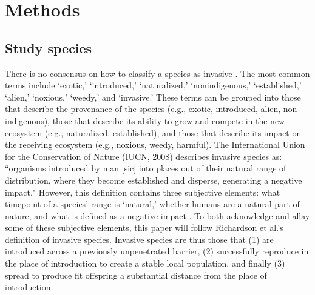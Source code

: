 \documentclass[12pt]{article}\usepackage[]{graphicx}\usepackage[]{color}
\begin{document}
	 
	\section{Methods}
	\subsection{Study species}
	There is no consensus on how to classify a species as invasive \parencite{Colautti2004}. The most common terms include `exotic,' `introduced,' `naturalized,' `nonindigenous,' `established,' `alien,' `noxious,' `weedy,' and `invasive.' These terms can be grouped into those that describe the provenance of the species (e.g., exotic, introduced, alien, non-indigenous), those that describe its ability to grow and compete in the new ecosystem (e.g., naturalized, established), and those that describe its impact on the receiving ecosystem (e.g., noxious, weedy, harmful). The International Union for the Conservation of Nature (IUCN, 2008) describes invasive species as: ``organisms introduced by man [sic] into places out of their natural range of distribution, where they become established and disperse, generating a negative impact." \nocite{IUCN2008is} However, this definition contains three subjective elements: what timepoint of a species' range is `natural,' whether humans are a natural part of nature, and what is defined as a negative impact \parencite{Munro2019}. To both acknowledge and allay some of these subjective elements, this paper will follow Richardson et al.'s \parencite{Richardson2000,Richardson2011} definition of invasive species. Invasive species are thus those that (1) are introduced across a previously unpenetrated barrier, (2) successfully reproduce in the place of introduction to create a stable local population, and finally (3) spread to produce fit offspring a substantial distance from the place of introduction.
	
\end{document}
